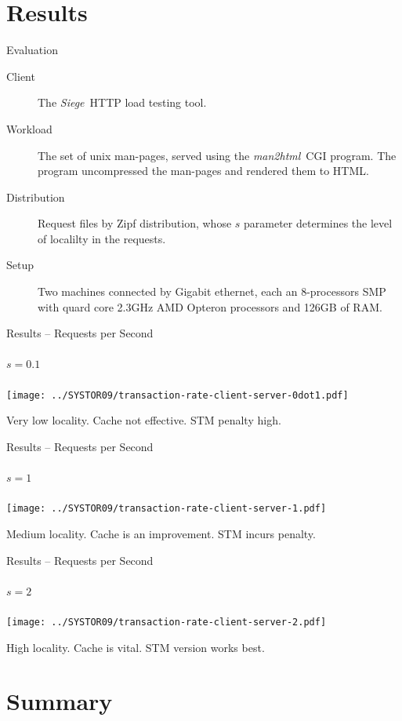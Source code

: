 \documentclass[]{beamer}
\newcommand{\Siege}{{\em Siege}~}
\newcommand{\ManToHtml}{{\em man2html}~}
\begin{document}
\section{Results}
\begin{frame}{Evaluation}
\begin{description}
\item[Client] The \Siege HTTP load testing tool.
\item[Workload] The set of unix man-pages, served using the \ManToHtml CGI
                program. The program uncompressed the man-pages and rendered
                them to HTML.
\item[Distribution] Request files by Zipf distribution, whose $s$ parameter
determines the level of localilty in the requests.
\item[Setup] Two machines connected by Gigabit ethernet, each an 8-processors
SMP with quard core 2.3GHz AMD Opteron processors and 126GB of RAM.
\end{description}
\end{frame}

\begin{frame}{Results -- Requests per Second}
\framesubtitle{$s=0.1$}
\texttt{[image: ../SYSTOR09/transaction-rate-client-server-0dot1.pdf]}

Very \alert{low} locality. Cache not effective. STM penalty high.
\end{frame}

\begin{frame}{Results -- Requests per Second}
\framesubtitle{$s=1$}
\texttt{[image: ../SYSTOR09/transaction-rate-client-server-1.pdf]}

\alert{Medium} locality. Cache is an improvement. STM incurs penalty.
\end{frame}

\begin{frame}{Results -- Requests per Second}
\framesubtitle{$s=2$}
\texttt{[image: ../SYSTOR09/transaction-rate-client-server-2.pdf]}

\alert{High} locality. Cache is vital. STM version works best.
\end{frame}

\section{Summary}
\end{document}
